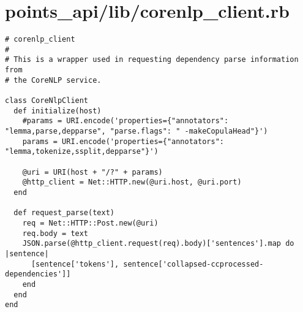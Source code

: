 \documentclass{article}
\begin{document}
\section*{points\_api/lib/corenlp\_client.rb}
\begin{verbatim}
# corenlp_client
#
# This is a wrapper used in requesting dependency parse information from
# the CoreNLP service.

class CoreNlpClient
  def initialize(host)
    #params = URI.encode('properties={"annotators": "lemma,parse,depparse", "parse.flags": " -makeCopulaHead"}')
    params = URI.encode('properties={"annotators": "lemma,tokenize,ssplit,depparse"}')

    @uri = URI(host + "/?" + params)
    @http_client = Net::HTTP.new(@uri.host, @uri.port)
  end

  def request_parse(text)
    req = Net::HTTP::Post.new(@uri)
    req.body = text
    JSON.parse(@http_client.request(req).body)['sentences'].map do |sentence|
      [sentence['tokens'], sentence['collapsed-ccprocessed-dependencies']]
    end
  end
end


\end{verbatim}
\pagebreak
\end{document}
